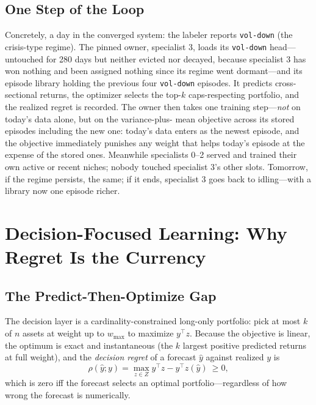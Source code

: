 \documentclass[10pt]{article}
\begin{document}
\subsection{One Step of the Loop}

Concretely, a day in the converged system: the labeler reports
\texttt{vol-down} (the crisis-type regime). The pinned owner, specialist
3, loads its \texttt{vol-down} head---untouched for 280 days but neither
evicted nor decayed, because specialist 3 has won nothing and been
assigned nothing since its regime went dormant---and its episode library
holding the previous four \texttt{vol-down} episodes. It predicts
cross-sectional returns, the optimizer selects the top-$k$ caps-respecting
portfolio, and the realized regret is recorded. The owner then takes one
training step---\emph{not} on today's data alone, but on the variance-plus-
mean objective across its stored episodes including the new one: today's
data enters as the newest episode, and the objective immediately punishes
any weight that helps today's episode at the expense of the stored ones.
Meanwhile specialists 0--2 served and trained their own active or recent
niches; nobody touched specialist 3's other slots. Tomorrow, if the regime
persists, the same; if it ends, specialist 3 goes back to idling---with a
library now one episode richer.

\section{Decision-Focused Learning: Why Regret Is the Currency}
\label{sec:decision}

\subsection{The Predict-Then-Optimize Gap}

The decision layer is a cardinality-constrained long-only portfolio: pick
at most $k$ of $n$ assets at weight up to $w_{\max}$ to maximize
$y^\top z$. Because the objective is linear, the optimum is exact and
instantaneous (the $k$ largest positive predicted returns at full
weight), and the \emph{decision regret} of a forecast $\hat y$ against
realized $y$ is
\[
  \rho(\hat y; y) = \max_{z \in Z} y^\top z - y^\top z(\hat y) \ \ge 0 ,
\]
which is zero iff the forecast selects an optimal portfolio---regardless
of how wrong the forecast is numerically.
\end{document}
